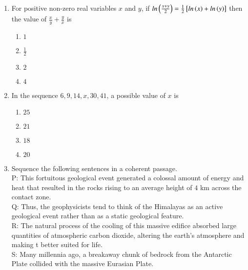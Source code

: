 \documentclass[journal]{IEEEtran}
\begin{document}
\begin{enumerate}
{The number of students who like their core branches is
\begin{multicols}{4}
\begin{enumerate}
\item $1800$
\item $3500$
\item $1600$
\item $1500$
\end{enumerate}
\end{multicols}
}
\item{
For positive non-zero real variables $x$ and $y$, if $ln\left(\frac{x+y}{2}\right)=\frac{1}{2}{}\left[ln\left(x\right)+ln\left(y\right)\right]$ then the value of $\frac{x}{y}+\frac{y}{x}$ is
\begin{multicols}{4}
\begin{enumerate}
\item $1$
\item $\frac{1}{2}$
\item $2$
\item $4$
\end{enumerate}
\end{multicols}
}
\item{
In the sequence $6,9,14,x,30,41$, a possible value of $x$ is
\begin{multicols}{4}
\begin{enumerate}
\item $25$
\item $21$
\item $18$
\item $20$
\end{enumerate}
\end{multicols}
}
\item{
Sequence the following sentences in a coherent passage.\\
P: This fortuitous geological event generated a colossal amount of energy and heat that resulted in the rocks rising to an average height of $4$ km across the contact zone.\\
Q: Thus, the geophysicists tend to think of the Himalayas as an active geological event rather than as a static geological feature.\\
R: The natural process of the cooling of this massive edifice absorbed large quantities of atmospheric carbon dioxide, altering the earth's atmosphere and making t better suited for life.\\
S: Many millennia ago, a breakaway chunk of bedrock from the Antarctic Plate collided with the massive Eurasian Plate.\\
}
\end{enumerate}
\end{document}
